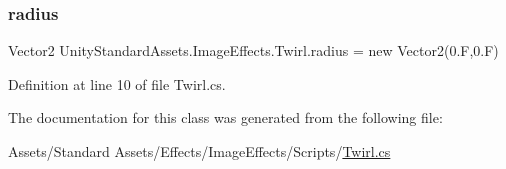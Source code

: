 \subsubsection{\texorpdfstring{radius}{radius}}
{\footnotesize\ttfamily Vector2 Unity\+Standard\+Assets.\+Image\+Effects.\+Twirl.\+radius = new Vector2(0.\+F,0.\+F)}



Definition at line 10 of file Twirl.\+cs.



The documentation for this class was generated from the following file\+:\begin{DoxyCompactItemize}
\item 
Assets/\+Standard Assets/\+Effects/\+Image\+Effects/\+Scripts/\mbox{\hyperlink{_twirl_8cs}{Twirl.\+cs}}\end{DoxyCompactItemize}
